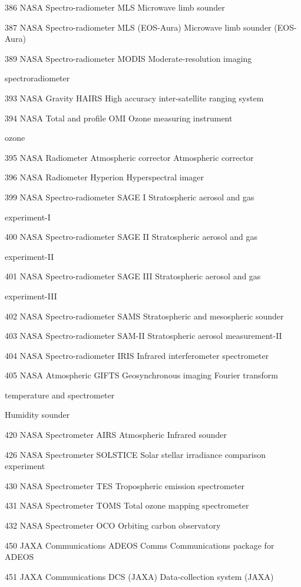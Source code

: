 386 NASA Spectro-radiometer MLS Microwave limb sounder

387 NASA Spectro-radiometer MLS (EOS-Aura) Microwave limb sounder (EOS-Aura)

389 NASA Spectro-radiometer MODIS Moderate-resolution imaging

spectroradiometer

393 NASA Gravity HAIRS High accuracy inter-satellite ranging system

394 NASA Total and profile OMI Ozone measuring instrument

ozone

395 NASA Radiometer Atmospheric corrector Atmospheric corrector

396 NASA Radiometer Hyperion Hyperspectral imager

399 NASA Spectro-radiometer SAGE I Stratospheric aerosol and gas

experiment-I

400 NASA Spectro-radiometer SAGE II Stratospheric aerosol and gas

experiment-II

401 NASA Spectro-radiometer SAGE III Stratospheric aerosol and gas

experiment-III

402 NASA Spectro-radiometer SAMS Stratospheric and mesospheric sounder

403 NASA Spectro-radiometer SAM-II Stratospheric aerosol measurement-II

404 NASA Spectro-radiometer IRIS Infrared interferometer spectrometer

405 NASA Atmospheric GIFTS Geosynchronous imaging Fourier transform

temperature and spectrometer

Humidity sounder

420 NASA Spectrometer AIRS Atmospheric Infrared sounder

426 NASA Spectrometer SOLSTICE Solar stellar irradiance comparison\\
experiment

430 NASA Spectrometer TES Tropospheric emission spectrometer

431 NASA Spectrometer TOMS Total ozone mapping spectrometer

432 NASA Spectrometer OCO Orbiting carbon observatory

450 JAXA Communications ADEOS Comms Communications package for ADEOS

451 JAXA Communications DCS (JAXA) Data-collection system (JAXA)

